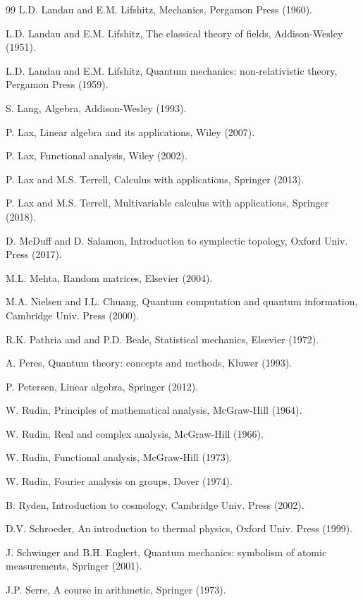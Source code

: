 \documentclass[12pt]{amsbook}
\begin{document}
\begin{thebibliography}{99}
L.D. Landau and E.M. Lifshitz, Mechanics, Pergamon Press (1960).

L.D. Landau and E.M. Lifshitz, The classical theory of fields, Addison-Wesley (1951).

L.D. Landau and E.M. Lifshitz, Quantum mechanics: non-relativistic theory, Pergamon Press (1959).

S. Lang, Algebra, Addison-Wesley (1993).

P. Lax, Linear algebra and its applications, Wiley (2007).

P. Lax, Functional analysis, Wiley (2002).

P. Lax and M.S. Terrell, Calculus with applications, Springer (2013).

P. Lax and M.S. Terrell, Multivariable calculus with applications, Springer (2018).

D. McDuff and D. Salamon, Introduction to symplectic topology, Oxford Univ. Press (2017).

M.L. Mehta, Random matrices, Elsevier (2004).

M.A. Nielsen and I.L. Chuang, Quantum computation and quantum information, Cambridge Univ. Press (2000).

R.K. Pathria and and P.D. Beale, Statistical mechanics, Elsevier (1972).

A. Peres, Quantum theory: concepts and methods, Kluwer (1993).

P. Petersen, Linear algebra, Springer (2012).

W. Rudin, Principles of mathematical analysis, McGraw-Hill (1964).

W. Rudin, Real and complex analysis, McGraw-Hill (1966).

W. Rudin, Functional analysis, McGraw-Hill (1973).

W. Rudin, Fourier analysis on groups, Dover (1974).

B. Ryden, Introduction to cosmology, Cambridge Univ. Press (2002).

D.V. Schroeder, An introduction to thermal physics, Oxford Univ. Press (1999).

J. Schwinger and B.H. Englert, Quantum mechanics: symbolism of atomic measurements, Springer (2001).

J.P. Serre, A course in arithmetic, Springer (1973).


\end{thebibliography}
\end{document}
